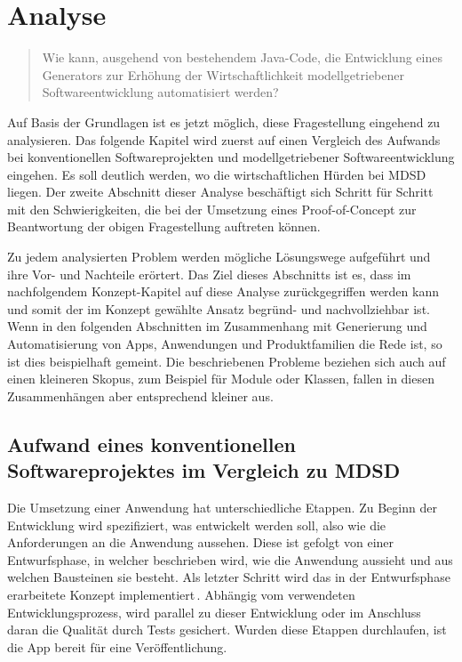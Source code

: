 \documentclass[12pt,oneside,a4paper,parskip]{scrbook}
\begin{document}
\chapter{Analyse}

\begin{quote}\glqq Wie kann, ausgehend von bestehendem Java-Code, die Entwicklung eines Generators zur Erhöhung der Wirtschaftlichkeit modellgetriebener Softwareentwicklung automatisiert werden?\grqq \end{quote}

Auf Basis der Grundlagen ist es jetzt möglich, diese Fragestellung eingehend zu analysieren. Das folgende Kapitel wird zuerst auf einen Vergleich des Aufwands bei konventionellen Softwareprojekten und modellgetriebener Softwareentwicklung eingehen. Es soll deutlich werden, wo die wirtschaftlichen Hürden bei MDSD liegen. Der zweite Abschnitt dieser Analyse beschäftigt sich Schritt für Schritt mit den Schwierigkeiten, die bei der Umsetzung eines Proof-of-Concept zur Beantwortung der obigen Fragestellung auftreten können.

Zu jedem analysierten Problem werden mögliche Lösungswege aufgeführt und ihre Vor- und Nachteile erörtert. Das Ziel dieses Abschnitts ist es, dass im nachfolgendem Konzept-Kapitel auf diese Analyse zurückgegriffen werden kann und somit der im Konzept gewählte Ansatz begründ- und nachvollziehbar ist. Wenn in den folgenden Abschnitten im Zusammenhang mit Generierung und Automatisierung von Apps, Anwendungen und Produktfamilien die Rede ist, so ist dies beispielhaft gemeint. Die beschriebenen Probleme beziehen sich auch auf einen kleineren Skopus, zum Beispiel für Module oder Klassen, fallen in diesen Zusammenhängen aber entsprechend kleiner aus.

\section{Aufwand eines konventionellen Softwareprojektes im Vergleich zu MDSD}

Die Umsetzung einer Anwendung hat unterschiedliche Etappen. Zu Beginn der Entwicklung wird spezifiziert, was entwickelt werden soll, also wie die Anforderungen an die Anwendung aussehen. Diese ist gefolgt von einer Entwurfsphase, in welcher beschrieben wird, wie die Anwendung aussieht und aus welchen Bausteinen sie besteht. Als letzter Schritt wird das in der Entwurfsphase erarbeitete Konzept implementiert\,\cite[S. 62]{balzert2009a}. Abhängig vom verwendeten Entwicklungsprozess, wird parallel zu dieser Entwicklung oder im Anschluss daran die Qualität durch Tests gesichert. Wurden diese Etappen durchlaufen, ist die App bereit für eine Veröffentlichung.
\end{document}
